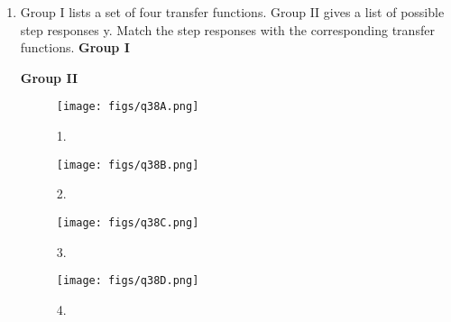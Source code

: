 \documentclass[a4paper, 11pt]{article}
\begin{document}
\begin{enumerate}
    \newpage
    \item Group I lists a set of four transfer functions. Group II gives a list of possible step responses y. Match the step responses with the corresponding transfer functions.
    \textbf{Group I}
    \begin{description}
    \end{description}
    \textbf{Group II}
    \begin{figure}[H]
        \centering
        \begin{minipage}{0.45\textwidth}
            \centering
            \texttt{[image: figs/q38A.png]}
            \centerline{1.}
        \end{minipage}
        \hfill
        \begin{minipage}{0.45\textwidth}
            \centering
            \texttt{[image: figs/q38B.png]}
            \centerline{2.}
        \end{minipage}
        \vfill
        \begin{minipage}{0.45\textwidth}
            \centering
            \texttt{[image: figs/q38C.png]}
            \centerline{3.}
        \end{minipage}
        \hfill
        \begin{minipage}{0.45\textwidth}
            \centering
            \texttt{[image: figs/q38D.png]}
            \centerline{4.}
        \end{minipage}
        \caption*{}
        \label{fig:q38_options}
    \end{figure}
    
    \begin{enumerate}
    \end{enumerate}


\end{enumerate}
\end{document}
